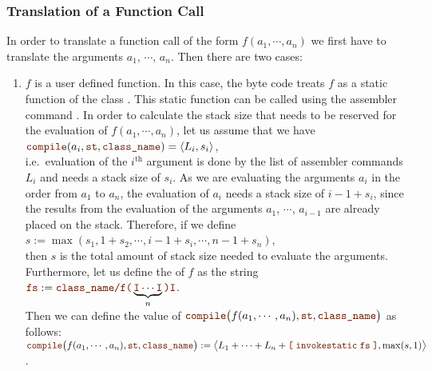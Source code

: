 \subsubsection{Translation of a Function Call}
In order to translate a function call of the form  $f(a_1, \cdots, a_n)$ we first have to translate the
arguments $a_1$, $\cdots$, $a_n$.  Then there are two cases:
\begin{enumerate}
\item $f$ is a user defined function.  In this case, the byte code treats $f$ as a static function of the
      class .  This static function can be called using the assembler command
      .  In order to calculate the stack size that needs to be reserved for the evaluation
      of  $f(a_1, \cdots, a_n)$, let us assume that we have
      \\[0.2cm]
      \hspace*{1.3cm}
      $\mytt{compile}(a_i, \mytt{st}, \mytt{class\_name}) = \pair(L_i, s_i)$,
      \\[0.2cm]
      i.e.~evaluation of the $i^\mathrm{th}$ argument is done by the list of assembler commands $L_i$ and
      needs a stack size of $s_i$.  As we are evaluating the arguments $a_i$ in the order from $a_1$ to $a_n$,
      the evaluation of $a_i$ needs a stack size of $i-1 + s_i$, since the results from the evaluation of
      the arguments $a_1$, $\cdots$, $a_{i-1}$ are already placed on the stack.  Therefore, if we define
      \\[0.2cm]
      \hspace*{1.3cm}
      $s := \max(s_1, 1 + s_2, \cdots, i - 1 + s_i, \cdots, n-1 + s_n)$,
      \\[0.2cm]
      then $s$ is the total amount of stack size needed to evaluate the arguments.  Furthermore, let us define
      the  of $f$ as the string
      \\[0.2cm]
      \hspace*{1.3cm}
      $\mytt{fs} := \mytt{class\_name/}\mytt{f(}\underbrace{\mytt{I}\cdots\mytt{I}}_{n}\mytt{)I}$.
      \\[0.2cm]
      Then we can define the
      value of
      $\mytt{compile}\bigl(f(a_1,\cdots,a_n), \mytt{st}, \mytt{class\_name}\bigr)$ as follows:
      \\[0.2cm]
      \hspace*{1.3cm}
      $\mytt{compile}\bigl(f(a_1,\cdots,a_n), \mytt{st}, \mytt{class\_name}\bigr) :=
      \bigl\langle L_1 + \cdots + L_n + \mytt{[} \; \mytt{invokestatic}\; \mytt{fs} \;\mytt{]}, \max(s,1)\bigr\rangle$.

\end{enumerate}
